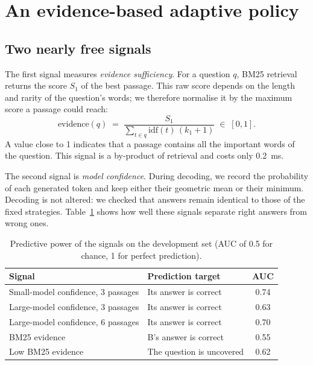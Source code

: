 \documentclass[11pt,a4paper]{article}
\begin{document}
\section{An evidence-based adaptive policy}\label{sec:politique}

\subsection{Two nearly free signals}

The first signal measures \emph{evidence sufficiency}. For a question $q$, BM25 retrieval returns the
score $S_1$ of the best passage. This raw score depends on the length and rarity of the question's
words; we therefore normalise it by the maximum score a passage could reach:
\[
\text{evidence}(q) \;=\; \frac{S_1}{\sum_{t \in q} \mathrm{idf}(t)\,(k_1+1)} \;\in\; [0,1].
\]
A value close to 1 indicates that a passage contains all the important words of the question. This
signal is a by-product of retrieval and costs only 0.2~ms.

The second signal is \emph{model confidence}. During decoding, we record the probability of each
generated token and keep either their geometric mean or their minimum. Decoding is not altered: we
checked that answers remain identical to those of the fixed strategies. Table~\ref{tab:auc} shows how
well these signals separate right answers from wrong ones.

\begin{table}[H]
\centering\small
\begin{tabular}{l l c}
\toprule
\textbf{Signal} & \textbf{Prediction target} & \textbf{AUC} \\
\midrule
Small-model confidence, 3 passages & Its answer is correct & 0.74 \\
Large-model confidence, 3 passages & Its answer is correct & 0.63 \\
Large-model confidence, 6 passages & Its answer is correct & 0.70 \\
BM25 evidence & B's answer is correct & 0.55 \\
Low BM25 evidence & The question is uncovered & 0.62 \\
\bottomrule
\end{tabular}
\caption{Predictive power of the signals on the development set (AUC of 0.5 for chance, 1 for perfect
prediction).}
\label{tab:auc}
\end{table}
\end{document}
